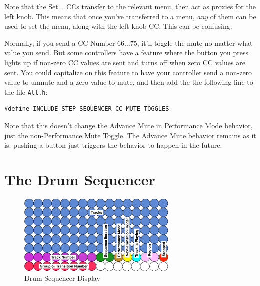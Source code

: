 \documentclass{article}
\begin{document}
\vspace{1em}
\noindent Note that the Set... CCs transfer to the relevant menu, then act as proxies for the left knob.  This means that once you've transferred to a menu, {\it any} of them can be used to set the menu, along with the left knob CC.  This can be confusing.

Normally, if you send a CC Number 66...75, it'll toggle the mute no matter what value you send.  But some controllers have a feature where the button you press lights up if non-zero CC values are sent and turns off when zero CC values are sent.  You could capitalize on this feature to have your controller send a non-zero value to unmute and a zero value to mute, and then add the the following line to the file {\tt All.h}:

\begin{verbatim}
#define INCLUDE_STEP_SEQUENCER_CC_MUTE_TOGGLES
\end{verbatim}

Note that this doesn't change the Advance Mute in Performance Mode behavior, just the non-Performance Mute Toggle.  The Advance Mute behavior remains as it is: pushing a button just triggers the behavior to happen in the future.

\clearpage



\section {The Drum Sequencer}
\label{drumsequencersec}

\vspace{1em}

\begin{figure}
\vspace{-3.5em}\includegraphics[width=3in]{drumsequencer}
\vspace{-1em}\caption{\small Drum Sequencer Display}\vspace{-2em}
\label{drumsequencer}
\end{figure}
\end{document}
